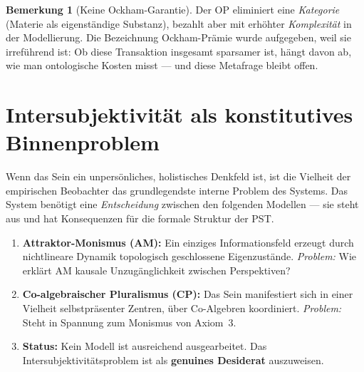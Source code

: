 \documentclass[11pt,a4paper]{article}
\theoremstyle{plain}
\theoremstyle{definition}
\newtheorem{remark}{Bemerkung}[section]
\begin{document}
\begin{remark}[Keine Ockham-Garantie]
Der OP eliminiert eine \emph{Kategorie} (Materie als eigenst\"{a}ndige Substanz),
bezahlt aber mit erh\"{o}hter \emph{Komplexit\"{a}t} in der Modellierung. Die
Bezeichnung \glqq{}Ockham-Pr\"{a}mie\grqq{} wurde aufgegeben, weil sie irref\"{u}hrend
ist: Ob diese Transaktion insgesamt sparsamer ist, h\"{a}ngt davon ab, wie man
ontologische Kosten misst --- und diese Metafrage bleibt offen.
\end{remark}

\section{Intersubjektivit\"{a}t als konstitutives Binnenproblem}

Wenn das Sein ein unpers\"{o}nliches, holistisches Denkfeld ist, ist die Vielheit der
empirischen Beobachter das grundlegendste interne Problem des Systems. Das System
ben\"{o}tigt eine \emph{Entscheidung} zwischen den folgenden Modellen --- sie steht aus
und hat Konsequenzen f\"{u}r die formale Struktur der PST.

\begin{enumerate}
  \item \textbf{Attraktor-Monismus (AM):} Ein einziges Informationsfeld erzeugt durch
        nichtlineare Dynamik topologisch geschlossene Eigenzust\"{a}nde.
        \emph{Problem:} Wie erkl\"{a}rt AM kausale Unzug\"{a}nglichkeit zwischen
        Perspektiven?

  \item \textbf{Co-algebraischer Pluralismus (CP):} Das Sein manifestiert sich in einer
        Vielheit selbstpr\"{a}senter Zentren, \"{u}ber Co-Algebren koordiniert.
        \emph{Problem:} Steht in Spannung zum Monismus von Axiom~3.

  \item \textbf{Status:} Kein Modell ist ausreichend ausgearbeitet. Das
        Intersubjektivit\"{a}tsproblem ist als \textbf{genuines Desiderat} auszuweisen.
\end{enumerate}
\end{document}
